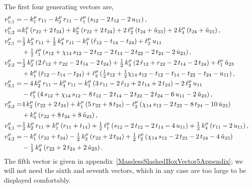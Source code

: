 \documentclass[aps,prd,preprint,groupedaddress,nofootinbib,showpacs,eqsecnum]{revtex4}
\begin{document}
The first four generating vectors are,
\begin{equation}
\begin{aligned}
v_{1;1}^\mu = &
-k_{1}^\mu\,r_{11}-k_{2}^\mu\,r_{11}
-\ell_1^\mu\,(s_{12}-2\,t_{12}-2\,u_{11})
\,,\\
v_{1;2}^\mu = &
k_{1}^\mu\,(r_{22}+2\,t_{24})
+k_{2}^\mu\,(r_{22}+2\,t_{24})
+2\,\ell_2^\mu\,(t_{24}+\check{u}_{23})
+2\,k_{4}^\mu\,(t_{24}+\check{u}_{23})
\,,\\
v_{2;1}^\mu = &
\tfrac{1}{2}\,k_{2}^\mu\,r_{11}+\tfrac{1}{2}\,k_{4}^\mu\,r_{11}
-k_{1}^\mu\,(\check{r}_{12}-t_{14}-t_{24})+\ell_2^\mu\,u_{11}
\\ &
+\tfrac{1}{2}\,\ell_1^\mu\,(s_{12}+\chi_{14}\,s_{12}-2\,t_{12}-2\,t_{14}
-2\,t_{22}-2\,t_{24}-2\,\check{u}_{23})
\,,\\
v_{2;2}^\mu = &
\tfrac{1}{2}\,k_{2}^\mu\,(2\,\check{r}_{12}+r_{22}-2\,t_{14}-2\,t_{24})
+\tfrac{1}{2}\,k_{4}^\mu\,(2\,\check{r}_{12}+r_{22}-2\,t_{14}-2\,t_{24})
+\ell_1^\mu\,\check{u}_{23}
\\ &
+k_{1}^\mu\,(\check{r}_{12}-t_{14}-t_{24})
+\ell_2^\mu\,(\tfrac{1}{2} s_{12}+\tfrac{1}{2}\chi_{14}\,s_{12}-t_{12}-t_{14}
-t_{22}-t_{24}-u_{11})
\,,\\
v_{3;1}^\mu = &
-4\,k_{2}^\mu\,r_{11}-k_{4}^\mu\,r_{11}
-k_{1}^\mu\,(3\,r_{11}-2\,\check{r}_{12}+2\,t_{14}+2\,t_{24})
-2\,\ell_2^\mu\,u_{11}
\\ &
-\ell_1^\mu\,(4\,s_{12}+\chi_{14}\,s_{12}-8\,t_{12}-2\,t_{14}
-2\,t_{22}-2\,t_{24}-6\,u_{11}-2\,\check{u}_{23})
\,,\\
v_{3;2}^\mu = &
4\,k_{2}^\mu\,(r_{22}+2\,t_{24})
+k_{1}^\mu\,(5\,r_{22}+8\,t_{24})
-\ell_2^\mu\,(\chi_{14}\,s_{12}-2\,t_{22}-8\,t_{24}-10\,\check{u}_{23})
\\ &
+k_{4}^\mu\,(r_{22}+8\,t_{24}+8\,\check{u}_{23})
\,,\\
v_{4;1}^\mu = &
\tfrac{1}{2}\,k_{2}^\mu\,r_{11}+k_{1}^\mu\,(r_{11}+t_{14})
+\tfrac{1}{2}\,\ell_1^\mu\,(s_{12}-2\,t_{12}-2\,t_{14}-4\,u_{11})
+\tfrac{1}{2}\,k_{4}^\mu\,(r_{11}-2\,u_{11})
\,,\\
v_{4;2}^\mu = &
-k_{1}^\mu\,(r_{22}+t_{24})
-\tfrac{1}{2}\,k_{2}^\mu\,(r_{22}+2\,t_{24})
+\tfrac{1}{2}\,\ell_2^\mu\,(\chi_{14}\,s_{12}-2\,t_{22}-2\,t_{24}-4\,\check{u}_{23})
\\ &
-\tfrac{1}{2}\,k_{4}^\mu\,(r_{22}+2\,t_{24}+2\,\check{u}_{23})
\,.\\
\end{aligned}
\label{SlashedBoxFirstQuartet}
\end{equation}
The fifth vector is given in appendix~\ref{MasslessSlashedBoxVector5Appendix};
we will not need the sixth and seventh vectors,
which in any case are too large to be displayed comfortably. 
\end{document}
